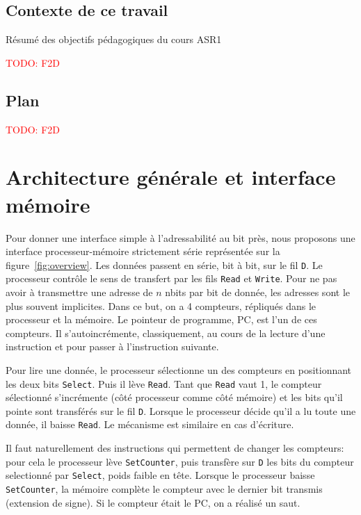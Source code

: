 \documentclass[architecture]{compas2018}
\newcommand{\todo}[1]{\textcolor{red}{TODO: #1}}
\begin{document}
\subsection{Contexte de ce travail}
Résumé des objectifs pédagogiques du cours ASR1

\todo{F2D}
\subsection{Plan}

\todo{F2D}
\fi


\section{Architecture générale et interface mémoire}
Pour donner une interface simple à l'adressabilité au bit près, nous proposons une interface processeur-mémoire strictement série représentée sur la figure~\ref{fig:overview}.
Les données passent en série, bit à bit, sur le fil \texttt{D}.
Le processeur contrôle le sens de transfert par les fils \texttt{Read} et \texttt{Write}.
Pour ne pas avoir à transmettre une adresse de $n$ nbits par bit de donnée, les adresses sont le plus souvent implicites.
Dans ce but, on a 4 compteurs, répliqués dans le processeur et la mémoire.
Le pointeur de programme, PC, est l'un de ces compteurs.
Il s'autoincrémente, classiquement, au cours de la lecture d'une instruction et pour passer à l'instruction suivante.

Pour lire une donnée, le processeur sélectionne un des compteurs en positionnant les deux bits  \texttt{Select}.
Puis il lève \texttt{Read}.
Tant que \texttt{Read} vaut 1, le compteur sélectionné s'incrémente (côté processeur comme côté mémoire) et les bits qu'il pointe sont transférés sur le fil \texttt{D}.
Lorsque le processeur décide qu'il a lu toute une donnée, il baisse \texttt{Read}.
Le mécanisme est similaire en cas d'écriture.

Il faut naturellement des instructions qui permettent de changer les compteurs: pour cela le processeur lève \texttt{SetCounter}, puis transfère sur \texttt{D} les bits du compteur selectionné par \texttt{Select}, poids faible en tête.
Lorsque le processeur baisse \texttt{SetCounter}, la mémoire complète le compteur avec le dernier bit transmis (extension de signe).
Si le compteur était le PC, on a réalisé un saut.
\end{document}
